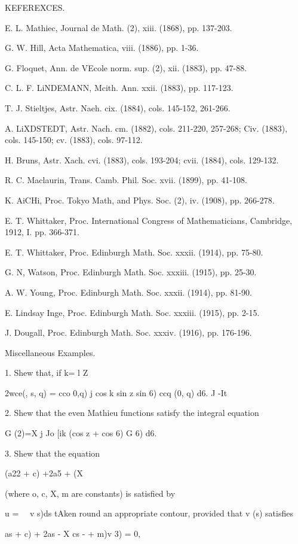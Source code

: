 {{KEFEREXCES.

E. L. Mathiec, Journal de Math. (2), xiii. (1868), pp. 137-203.

G. W. Hill, Acta Mathematica, viii. (1886), pp. 1-36.

G. Floquet, Ann. de VEcole norm. sup. (2), xii. (1883), pp. 47-88.

C. L. F. LiNDEMANN, Mcith. Ann. xxii. (1883), pp. 117-123.

T. J. Stieltjes, Astr. Naeh. cix. (1884), cols. 145-152, 261-266.

A. LiXDSTEDT, Astr. Nach. cm. (1882), cols. 211-220, 257-268; Civ.
(1883), cols. 145-150; cv. (1883), cols. 97-112.

H. Bruns, Astr. Xach. cvi. (1883), cols. 193-204; cvii. (1884), cols.
129-132.

R. C. Maclaurin, Trans. Camb. Phil. Soc. xvii. (1899), pp. 41-108.

K. AiCHi, Proc. Tokyo Math, and Phys. Soc. (2), iv. (1908), pp.
266-278.

E. T. Whittaker, Proc. International Congress of Mathematicians,
Cambridge, 1912, I. pp. 366-371.

E. T. Whittaker, Proc. Edinburgh Math. Soc. xxxii. (1914), pp. 75-80.

G. N, Watson, Proc. Edinburgh Math. Soc. xxxiii. (1915), pp. 25-30.

A. W. Young, Proc. Edinburgh Math. Soc. xxxii. (1914), pp. 81-90.

E. Lindsay Inge, Proc. Edinburgh Math. Soc. xxxiii. (1915), pp. 2-15.

J. Dougall, Proc. Edinburgh Math. Soc. xxxiv. (1916), pp. 176-196.

Miscellaneous Examples.

1. Shew that, if k= l Z \

2wce(, s, q) = cco 0,q) j cos k sin z sin 6) ccq (0, q) d6. J -It

2. Shew that the even Mathieu functions satisfy the integral equation

G (2)=X j Jo [ik (cos z + cos 6) G 6) d6.

3. Shew that the equation

(a22 + c) +2a5 + (X%

(where o, c, X, m are constants) is satisfied by

u = \ \ v s)ds tAken round an appropriate contour, provided that v (s)
satisfies

 as + c) + 2as - X cs - + m)v 3) = 0,

}}
